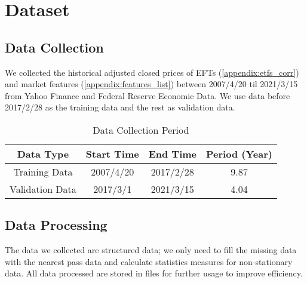 \section{Dataset}
\subsection{Data Collection}
We collected the historical adjusted closed prices of EFTs (\autoref{appendix:etfs_corr}) and market features (\autoref{appendix:features_list}) between 2007/4/20 til  2021/3/15 from Yahoo Finance and Federal Reserve Economic Data. We use data before 2017/2/28 as the training data and the rest as validation data.
\begin{table}[htb]
    \centering
        \begin{tabular}{||c|c|c|c||}
        \hline \hline
        Data Type & Start Time & End Time & Period (Year) \\ \hline \hline
        Training Data  &  2007/4/20 & 2017/2/28 & 9.87\\ \hline
        Validation Data & 2017/3/1 & 2021/3/15 & 4.04 \\ 
        \hline \hline
        \end{tabular}
    \caption{Data Collection Period}
    \label{tab:dataset}
\end{table}


\subsection{Data Processing}
The data we collected are structured data; we only need to fill the missing data with the nearest pass data and calculate statistics measures for non-stationary data.  All data processed are stored in files for further usage to improve efficiency. 